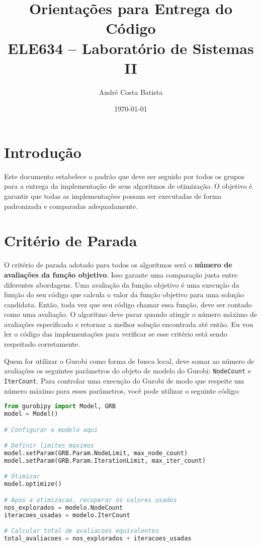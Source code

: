 \documentclass[12pt,a4paper]{article}
\title{\textbf{Orientações para Entrega do Código}\\[0.5cm]
\large ELE634 -- Laboratório de Sistemas II}
\author{André Costa Batista}
\date{\today}
\begin{document}
\maketitle

\section{Introdução}

Este documento estabelece o padrão que deve ser seguido por todos os grupos para a entrega da implementação de seus algoritmos de otimização. O objetivo é garantir que todas as implementações possam ser executadas de forma padronizada e comparadas adequadamente.

\section{Critério de Parada}

O critério de parada adotado para todos os algoritmos será o \textbf{número de avaliações da função objetivo}. Isso garante uma comparação justa entre diferentes abordagens. Uma avaliação da função objetivo é uma execução da função do seu código que calcula o valor da função objetivo para uma solução candidata. Então, toda vez que seu código chamar essa função, deve ser contado como uma avaliação. O algoritmo deve parar quando atingir o número máximo de avaliações especificado e retornar a melhor solução encontrada até então. Eu vou ler o código das implementações para verificar se esse critério está sendo respeitado corretamente.

Quem for utilizar o Gurobi como forma de busca local, deve somar ao número de avaliações os seguintes parâmetros do objeto de modelo do Gurobi: \texttt{NodeCount} e \texttt{IterCount}. Para controlar uma execução do Gurobi de modo que respeite um número máximo para esses parâmetros, você pode utilizar o seguinte código:
\begin{lstlisting}[language=Python]
from gurobipy import Model, GRB
model = Model()

# Configurar o modelo aqui

# Definir limites maximos
model.setParam(GRB.Param.NodeLimit, max_node_count)
model.setParam(GRB.Param.IterationLimit, max_iter_count)

# Otimizar
model.optimize()

# Apos a otimizacao, recuperar os valores usados
nos_explorados = modelo.NodeCount
iteracoes_usadas = modelo.IterCount

# Calcular total de avaliacoes equivalentes
total_avaliacoes = nos_explorados + iteracoes_usadas
\end{lstlisting}
\end{document}
